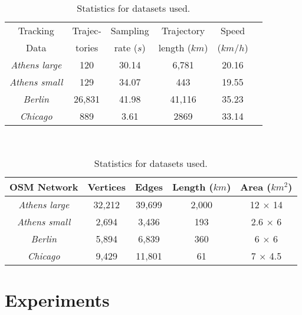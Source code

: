 \documentclass[natbib]{svjour3}                    \smartqed  \usepackage[table]{xcolor}
\begin{document}
\begin{table}
	[t] \centering \scriptsize 
	\begin{tabular}
		{|c||c|c|c|c|c|} \hline Tracking & Trajec- & Sampling & Trajectory & Speed \\
		Data & tories & rate ($s$) & length ($km$) & ($km$/$h$) \\
		\hline \hline \emph{Athens large} & 120 & 30.14 & 6,781 & 20.16 \\
		\hline \emph{Athens small} & 129  & 34.07 & 443 & 19.55 \\
		\hline \emph{Berlin} & 26,831 & 41.98 & 41,116 & 35.23 \\
		\hline \emph{Chicago} & 889 & 3.61 & 2869 & 33.14 \\
		\hline 
	\end{tabular}
	\\
	\vspace{10pt} 
	\begin{tabular}
		{|c||c|c|c|c|} \hline OSM Network & Vertices & Edges & Length ($km$) & Area ($km^2$) \\
		\hline \hline \emph{Athens large} & 32,212 & 39,699 & 2,000 & 12 $\times$ 14 \\
		\hline \emph{Athens small} & 2,694 & 3,436 & 193 & 2.6 $\times$ 6 \\
		\hline \emph{Berlin} & 5,894 & 6,839 & 360 & 6 $\times$ 6 \\
		\hline \emph{Chicago} & 9,429 & 11,801 & 61 & 7 $\times$ 4.5 \\
		\hline 
	\end{tabular}
	\caption{Statistics for datasets used.} \label{tab:dstatistics}  
\end{table}


\section{Experiments}
\label{sec:sec_exp}
\end{document}
